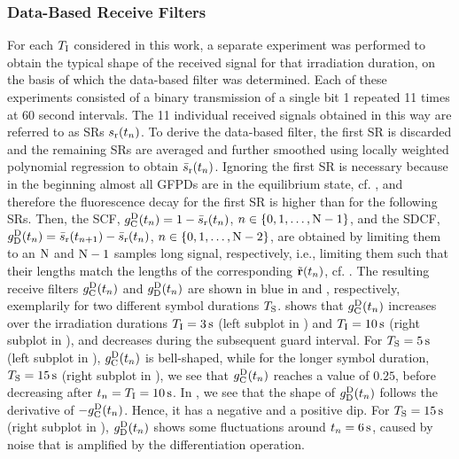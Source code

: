 \subsubsection{Data-Based Receive Filters}\label{data_filter}
\scaleSubsubsectionBelow
For each $T_{\mathrm{I}}$ considered in this work, a separate experiment was performed to obtain the typical shape of the received signal for that irradiation duration, on the basis of which the data-based filter was determined. Each of these experiments consisted of a binary transmission of a single bit 1 repeated 11 times at 60 second intervals. The 11 individual received signals obtained in this way are referred to as \acp{SR} $s_{\mathrm{r}}(t_n)$. To derive the data-based filter, the first \ac{SR} is discarded and the remaining \acp{SR} are averaged and further smoothed using locally weighted polynomial regression \cite{cleveland1988locally} to obtain $\bar{s}_{\mathrm{r}}(t_n)$. Ignoring the first \ac{SR} is necessary because in the beginning almost all \acp{GFPD} are in the equilibrium state, cf. , and therefore the fluorescence decay for the first \ac{SR} is higher than for the following \acp{SR}.
Then, the \ac{SCF}, $g^{\mathrm{D}}_{\mathrm{C}}(t_n)  = 1 - \bar{s}_{\mathrm{r}}(t_n)$, $n \in \{0, 1, \ldots, \mathrm{N}-1\}$, and the \ac{SDCF}, $g^{\mathrm{D}}_{\mathrm{D}}(t_n)  = \bar{s}_{\mathrm{r}}(t_{n+1}) - \bar{s}_{\mathrm{r}}(t_n)$, $n \in \{0, 1, \ldots, \mathrm{N}-2\}$, are obtained by limiting them to an $\mathrm{N}$ and $\mathrm{N}-1$ samples long signal, respectively, i.e., limiting them such that their lengths match the lengths of the corresponding $\Tilde{\mathbf{r}}(t_n)$, cf. . The resulting receive filters $g^{\mathrm{D}}_{\mathrm{C}}(t_n)$ and $g^{\mathrm{D}}_{\mathrm{D}}(t_n)$ are shown in blue in  and , respectively, exemplarily for two different symbol durations $T_{\mathrm{S}}$.  shows that $g^{\mathrm{D}}_{\mathrm{C}}(t_n)$ increases over the irradiation durations $T_{\mathrm{I}}=\SI{3}{\second}$ (left subplot in ) and $T_{\mathrm{I}}=\SI{10}{\second}$ (right subplot in ), and decreases during the subsequent guard interval. For $T_{\mathrm{S}}=\SI{5}{\second}$ (left subplot in ), $g^{\mathrm{D}}_{\mathrm{C}}(t_n)$ is bell-shaped, while for the longer symbol duration, $T_{\mathrm{S}}=\SI{15}{\second}$ (right subplot in ), we see that $g^{\mathrm{D}}_{\mathrm{C}}(t_n)$ reaches a value of $0.25$, before decreasing after $t_n = T_{\mathrm{I}} = \SI{10}{\second}$. In , we see that the shape of $g^{\mathrm{D}}_{\mathrm{D}}(t_n)$ follows the derivative of $- g^{\mathrm{D}}_{\mathrm{C}}(t_n)$. Hence, it has a negative and a positive dip. For $T_{\mathrm{S}}=\SI{15}{\second}$ (right subplot in ), $g^{\mathrm{D}}_{\mathrm{D}}(t_n)$ shows some fluctuations around $t_n=\SI{6}{\second}$, caused by noise that is amplified by the differentiation operation.
%
\scaleSubsubsection
